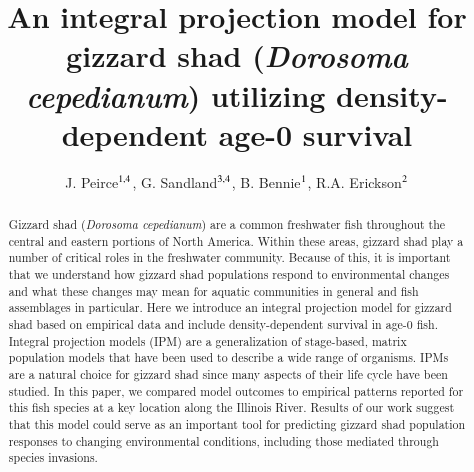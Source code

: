 \documentclass[preprint,review,12pt,authoryear]{elsarticle}
\begin{document}
\linenumbers
\begin{frontmatter}


\title{An integral projection model for gizzard shad (\emph{Dorosoma cepedianum}) utilizing density-dependent age-0 survival}

\author{ J. Peirce$^{\rm 1,4}$,  G.  Sandland$^{\rm 3,4}$, B. Bennie$^{\rm 1}$, R.A. Erickson$^{\rm 2}$}
\address{
${\rm 1}$ University of Wisconsin - La Crosse, Mathematics \& Statistics Department\\ 
${\rm 2}$ U.S.G.S. Upper Mississippi Environmental Science Center\\ 
${\rm 3}$ University of Wisconsin - La Crosse, Biology Department\\
${\rm 4}$ River Studies Center} 

\begin{abstract}
Gizzard shad (\emph{Dorosoma cepedianum}) are a common freshwater fish throughout the central and eastern portions of North America. 
Within these areas, gizzard shad play a number of critical roles in the freshwater community. 
Because of this, it is important that we understand how gizzard shad populations respond to environmental changes and what these changes may mean for aquatic communities in general and fish assemblages in particular. 
Here we introduce an integral projection model for gizzard shad based on empirical data and include density-dependent survival in age-0 fish. 
Integral projection models (IPM) are a generalization of stage-based, matrix population models that have been used to describe a wide range of organisms. 
IPMs are a natural choice for gizzard shad since many aspects of their life cycle have been studied. 
In this paper, we compared model outcomes to empirical patterns reported for this fish species at a key location along the Illinois River. 
Results of our work suggest that this model could serve as an important tool for predicting gizzard shad population responses to changing environmental conditions, including those mediated through species invasions.
\end{abstract}

\begin{graphicalabstract}
\begin{figure}
\label{llife_cycle}
    \begin{center}
\begin{tikzpicture}[->,>=stealth',shorten >=1pt,auto,node distance=3cm,
  thick,
  main node/.style={rectangle,draw},
  box/.style = {draw=gray, very thick,
                            minimum height=11mm, text width=11mm, 
                            align=center},]
                              

\end{tikzpicture}
\end{center}
\end{figure}
\end{graphicalabstract}
\end{frontmatter}
\end{document}
